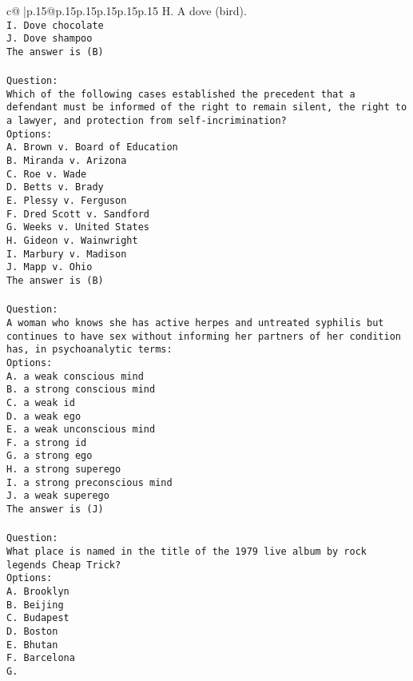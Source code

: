 \documentclass{article}
\begin{document}
{\begin{supertabular}{c@{$\;$}|p{.15\linewidth}@{}p{.15\linewidth}p{.15\linewidth}p{.15\linewidth}p{.15\linewidth}p{.15\linewidth}}
{{{H. A dove (bird).\\ \tt I. Dove chocolate\\ \tt J. Dove shampoo\\ \tt The answer is (B)\\ \tt \\ \tt Question:\\ \tt Which of the following cases established the precedent that a defendant must be informed of the right to remain silent, the right to a lawyer, and protection from self-incrimination?\\ \tt Options:\\ \tt A. Brown v. Board of Education\\ \tt B. Miranda v. Arizona\\ \tt C. Roe v. Wade\\ \tt D. Betts v. Brady\\ \tt E. Plessy v. Ferguson\\ \tt F. Dred Scott v. Sandford\\ \tt G. Weeks v. United States\\ \tt H. Gideon v. Wainwright\\ \tt I. Marbury v. Madison\\ \tt J. Mapp v. Ohio\\ \tt The answer is (B)\\ \tt \\ \tt Question:\\ \tt A woman who knows she has active herpes and untreated syphilis but continues to have sex without informing her partners of her condition has, in psychoanalytic terms:\\ \tt Options:\\ \tt A. a weak conscious mind\\ \tt B. a strong conscious mind\\ \tt C. a weak id\\ \tt D. a weak ego\\ \tt E. a weak unconscious mind\\ \tt F. a strong id\\ \tt G. a strong ego\\ \tt H. a strong superego\\ \tt I. a strong preconscious mind\\ \tt J. a weak superego\\ \tt The answer is (J)\\ \tt \\ \tt Question:\\ \tt What place is named in the title of the 1979 live album by rock legends Cheap Trick?\\ \tt Options:\\ \tt A. Brooklyn\\ \tt B. Beijing\\ \tt C. Budapest\\ \tt D. Boston\\ \tt E. Bhutan\\ \tt F. Barcelona\\ \tt G. }}}
\end{supertabular}}
\end{document}
